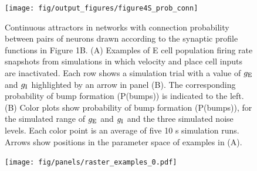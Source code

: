 \documentclass[a4paper,12pt]{article}
\newcommand{\ssc}[3]{\ensuremath{#1_{\text{#2}_{\text{#3}}}}}
\newcommand{\gE      }{\ssc{g}      {\scriptsize{E}}{}}
\newcommand{\gI      }{\ssc{g}      {\scriptsize{I}}{}}
\begin{document}
\clearpage

\setcounter{figure}{0}
\renewcommand{\figurename}{Figure 4 - figure supplement}

\begin{figure}[p]
    \internallinenumbers
    \centering
        \texttt{[image: fig/output\_figures/figure4S\_prob\_conn]}
    \caption{Continuous attractors in networks with connection probability
    between pairs of neurons drawn according to the synaptic profile functions
    in Figure 1B. (A) Examples of E cell population firing rate snapshots from
    simulations in which velocity and place cell inputs are inactivated. Each
    row shows a simulation trial with a value of $\gE$ and $\gI$ highlighted by an
    arrow in panel (B). The corresponding probability of bump formation
    (P(bumps)) is indicated to the left.  (B) Color plots show probability of
    bump formation (P(bumps)), for the simulated range of $\gE$ and $\gI$ and the
    three simulated noise levels. Each color point is an average of five 10 s
    simulation runs. Arrows show positions in the parameter space of examples
    in (A).}
\end{figure}

\clearpage

%

\begin{figure}[p]
    \centering
        \texttt{[image: fig/panels/raster\_examples\_0.pdf]}
\end{figure}
\end{document}
